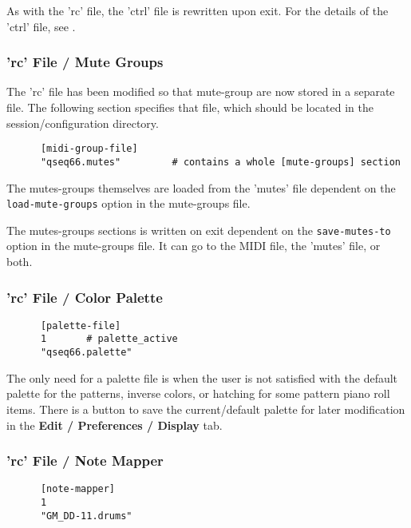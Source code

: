    As with the 'rc' file, the 'ctrl' file is rewritten upon exit.
   For the details of the 'ctrl' file, see
   .

\subsubsection{'rc' File / Mute Groups}
\label{subsubsec:configuration_rc_mute_groups}

   The 'rc' file has been modified so that mute-group are now stored in a
   separate file.  The following section specifies that file, which should be
   located in the session/configuration directory.

   \begin{verbatim}
      [midi-group-file]
      "qseq66.mutes"         # contains a whole [mute-groups] section
   \end{verbatim}

   The mutes-groups themselves are loaded from the 'mutes' file dependent on
   the \texttt{load-mute-groups} option in the mute-groups file.

   The mutes-groups sections is written on exit dependent on the
   \texttt{save-mutes-to} option in the mute-groups file.
   It can go to the MIDI file, the 'mutes' file, or both.

\subsubsection{'rc' File / Color Palette}
\label{subsubsec:configuration_rc_color_palette}

   \begin{verbatim}
      [palette-file]
      1       # palette_active
      "qseq66.palette"
   \end{verbatim}

   The only need for a palette file is when the user is not satisfied with the
   default palette for the patterns, inverse colors, or hatching for some pattern
   piano roll items.  There is a button to save the current/default palette for
   later modification in the \textbf{Edit / Preferences / Display} tab.

\subsubsection{'rc' File / Note Mapper}
\label{subsubsec:configuration_rc_note_mapper}

   \begin{verbatim}
      [note-mapper]
      1
      "GM_DD-11.drums"
   \end{verbatim}

